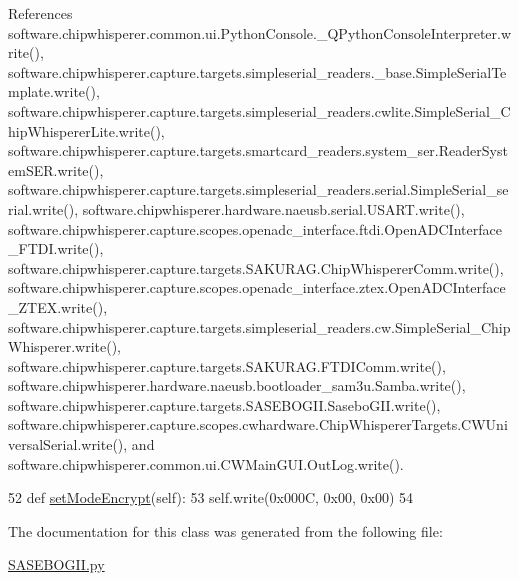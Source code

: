 References software.\+chipwhisperer.\+common.\+ui.\+Python\+Console.\+\_\+\+Q\+Python\+Console\+Interpreter.\+write(), software.\+chipwhisperer.\+capture.\+targets.\+simpleserial\+\_\+readers.\+\_\+base.\+Simple\+Serial\+Template.\+write(), software.\+chipwhisperer.\+capture.\+targets.\+simpleserial\+\_\+readers.\+cwlite.\+Simple\+Serial\+\_\+\+Chip\+Whisperer\+Lite.\+write(), software.\+chipwhisperer.\+capture.\+targets.\+smartcard\+\_\+readers.\+system\+\_\+ser.\+Reader\+System\+S\+E\+R.\+write(), software.\+chipwhisperer.\+capture.\+targets.\+simpleserial\+\_\+readers.\+serial.\+Simple\+Serial\+\_\+serial.\+write(), software.\+chipwhisperer.\+hardware.\+naeusb.\+serial.\+U\+S\+A\+R\+T.\+write(), software.\+chipwhisperer.\+capture.\+scopes.\+openadc\+\_\+interface.\+ftdi.\+Open\+A\+D\+C\+Interface\+\_\+\+F\+T\+D\+I.\+write(), software.\+chipwhisperer.\+capture.\+targets.\+S\+A\+K\+U\+R\+A\+G.\+Chip\+Whisperer\+Comm.\+write(), software.\+chipwhisperer.\+capture.\+scopes.\+openadc\+\_\+interface.\+ztex.\+Open\+A\+D\+C\+Interface\+\_\+\+Z\+T\+E\+X.\+write(), software.\+chipwhisperer.\+capture.\+targets.\+simpleserial\+\_\+readers.\+cw.\+Simple\+Serial\+\_\+\+Chip\+Whisperer.\+write(), software.\+chipwhisperer.\+capture.\+targets.\+S\+A\+K\+U\+R\+A\+G.\+F\+T\+D\+I\+Comm.\+write(), software.\+chipwhisperer.\+hardware.\+naeusb.\+bootloader\+\_\+sam3u.\+Samba.\+write(), software.\+chipwhisperer.\+capture.\+targets.\+S\+A\+S\+E\+B\+O\+G\+I\+I.\+Sasebo\+G\+I\+I.\+write(), software.\+chipwhisperer.\+capture.\+scopes.\+cwhardware.\+Chip\+Whisperer\+Targets.\+C\+W\+Universal\+Serial.\+write(), and software.\+chipwhisperer.\+common.\+ui.\+C\+W\+Main\+G\+U\+I.\+Out\+Log.\+write().


\begin{DoxyCode}
52     \textcolor{keyword}{def }\hyperlink{classsoftware_1_1chipwhisperer_1_1capture_1_1targets_1_1SASEBOGII_1_1SaseboGIIDPAContest_a3d398e9dfdd13fcf99ab8ab79ac39a2f}{setModeEncrypt}(self):
53         self.write(0x000C, 0x00, 0x00)
54 
\end{DoxyCode}


The documentation for this class was generated from the following file\+:\begin{DoxyCompactItemize}
\item 
\hyperlink{SASEBOGII_8py}{S\+A\+S\+E\+B\+O\+G\+I\+I.\+py}\end{DoxyCompactItemize}
